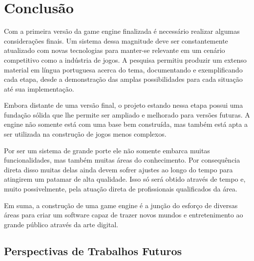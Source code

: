 \documentclass[12pt, 
openright, 
oneside, 
a4paper,    
brazil]{facom-ufu-abntex2}
\begin{document}

\chapter{Conclusão}
\label{sec:conclus}
Com a primeira versão da game engine finalizada é necessário realizar algumas considerações finais. Um sistema dessa magnitude deve ser constantemente atualizado com novas tecnologias para manter-se relevante em um cenário competitivo como a indústria de jogos. A pesquisa permitiu produzir um extenso material em língua portuguesa acerca do tema, documentando e exemplificando cada etapa, desde a demonstração das amplas possibilidades para cada situação até sua implementação.

Embora distante de uma versão final, o projeto estando nessa etapa possui uma fundação sólida que lhe permite ser ampliado e melhorado para versões futuras. A engine não somente está com uma base bem construída, mas também está apta a ser utilizada na construção de jogos menos complexos.

Por ser um sistema de grande porte ele não somente embarca muitas funcionalidades, mas também muitas áreas do conhecimento. Por consequência direta disso muitas delas ainda devem sofrer ajustes ao longo do tempo para atingirem um patamar de alta qualidade. Isso só será obtido através de tempo e, muito possivelmente, pela atuação direta de profissionais qualificados da área.

Em suma, a construção de uma game engine é a junção do esforço de diversas áreas para criar um software capaz de trazer novos mundos e entretenimento ao grande público através da arte digital.

\section{Perspectivas de Trabalhos Futuros}
\end{document}
